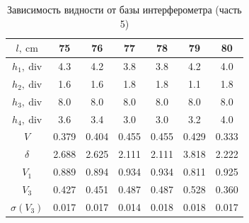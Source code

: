 \documentclass[12pt, a4paper]{article}
\begin{document}
\begin{table}[h!]
    \centering
    \caption{Зависимость видности от базы интерферометра (часть 5)}
    \begin{tabular}{|c|c|c|c|c|c|c|}
        \hline
        $l,~\mathrm{cm}$    & 75    & 76    & 77    & 78    & 79    & 80    \\
        \hline
        $h_1,~\mathrm{div}$ & 4.3   & 4.2   & 3.8   & 3.8   & 4.2   & 4.0   \\
        \hline
        $h_2,~\mathrm{div}$ & 1.6   & 1.6   & 1.8   & 1.8   & 1.1   & 1.8   \\
        \hline
        $h_3,~\mathrm{div}$ & 8.0   & 8.0   & 8.0   & 8.0   & 8.0   & 8.0   \\
        \hline
        $h_4,~\mathrm{div}$ & 3.6   & 3.4   & 3.0   & 3.0   & 3.2   & 4.0   \\
        \hline
        $V$                 & 0.379 & 0.404 & 0.455 & 0.455 & 0.429 & 0.333 \\
        \hline
        $\delta$            & 2.688 & 2.625 & 2.111 & 2.111 & 3.818 & 2.222 \\
        \hline
        $V_1$               & 0.889 & 0.894 & 0.934 & 0.934 & 0.811 & 0.925 \\
        \hline
        $V_3$               & 0.427 & 0.451 & 0.487 & 0.487 & 0.528 & 0.360 \\
        \hline
        $\sigma(V_3)$       & 0.017 & 0.017 & 0.014 & 0.018 & 0.018 & 0.017 \\
        \hline
    \end{tabular}
\end{table}
\end{document}
